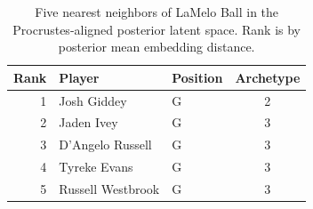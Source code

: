\begin{table}[htbp]
  \centering\small
  \begin{tabular}{rllc}
    \toprule
    Rank & Player & Position & Archetype \\
    \midrule
    1 & Josh Giddey & G & 2 \\
    2 & Jaden Ivey & G & 3 \\
    3 & D'Angelo Russell & G & 3 \\
    4 & Tyreke Evans & G & 3 \\
    5 & Russell Westbrook & G & 3 \\
    \bottomrule
  \end{tabular}
  \caption{Five nearest neighbors of LaMelo Ball in the Procrustes-aligned posterior latent space. Rank is by posterior mean embedding distance.}
  \label{tab:LaMelo_Ball_neighbors}
\end{table}

